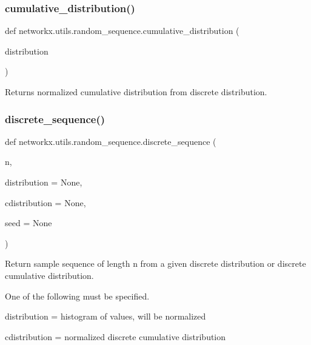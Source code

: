 \subsubsection{\texorpdfstring{cumulative\+\_\+distribution()}{cumulative\_distribution()}}
{\footnotesize\ttfamily def networkx.\+utils.\+random\+\_\+sequence.\+cumulative\+\_\+distribution (\begin{DoxyParamCaption}\item[{}]{distribution }\end{DoxyParamCaption})}

\begin{DoxyVerb}Returns normalized cumulative distribution from discrete distribution.\end{DoxyVerb}
 \mbox{\label{namespacenetworkx_1_1utils_1_1random__sequence_a5f8c7a8a6de006f5ecc0b44530949bae}} 
\subsubsection{\texorpdfstring{discrete\+\_\+sequence()}{discrete\_sequence()}}
{\footnotesize\ttfamily def networkx.\+utils.\+random\+\_\+sequence.\+discrete\+\_\+sequence (\begin{DoxyParamCaption}\item[{}]{n,  }\item[{}]{distribution = {\ttfamily None},  }\item[{}]{cdistribution = {\ttfamily None},  }\item[{}]{seed = {\ttfamily None} }\end{DoxyParamCaption})}

\begin{DoxyVerb}Return sample sequence of length n from a given discrete distribution
or discrete cumulative distribution.

One of the following must be specified.

distribution = histogram of values, will be normalized

cdistribution = normalized discrete cumulative distribution\end{DoxyVerb}
 \mbox{\label{namespacenetworkx_1_1utils_1_1random__sequence_acc7ecaff954cb4c276746ad0f1a679b0}} 
